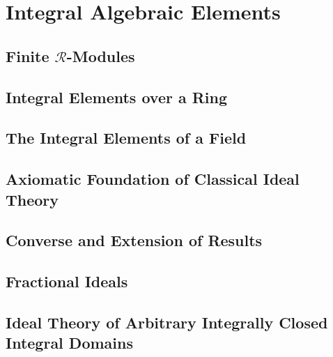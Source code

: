 \section{Integral Algebraic Elements}

\subsection{Finite  $\mathcal{R}$-Modules}

\subsection{Integral Elements over a Ring}

\subsection{The Integral Elements of a Field}

\subsection{Axiomatic Foundation of Classical Ideal Theory}

\subsection{Converse and Extension of Results}

\subsection{Fractional Ideals}

\subsection{Ideal Theory of Arbitrary Integrally Closed Integral Domains}